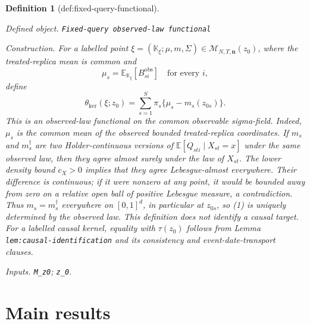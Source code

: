 \documentclass{article}
\newtheorem{definition}{Definition}
\begin{document}
\begin{definition}[def:fixed-query-functional]\label{def:fixed-query-functional}
\par\smallskip\noindent\emph{Defined object.} \texttt{Fixed-\allowbreak{}query observed-\allowbreak{}law functional}
\par\smallskip\noindent\emph{Construction.} For a labelled point
\(\xi=(\mathbb K_\xi;\mu,m,\Sigma)\in
\mathcal M_{N,T,\mathbf n}(z_0)\), where the treated-replica mean is common and
\[
 \mu_s=\mathbb E_{\mathbb K_\xi}[B_{si}^{\mathrm{obs}}]
 \quad\text{for every }i,
\]
define
\[
 \theta_{\mathrm{ker}}(\xi;z_0)
 =\sum_{s=1}^{S}\pi_s\{\mu_s-m_s(z_{0s})\}.                   \tag{1}
\]
This is an observed-law functional on the common observable sigma-field.  Indeed, \(\mu_s\) is the common mean of the observed bounded treated-replica coordinates.  If \(m_s\) and \(m_s^\dagger\) are two Holder-continuous versions of
\(\mathbb E[Q_{sti}\mid X_{st}=x]\) under the same observed law, then they agree almost surely under the law of \(X_{st}\).  The lower density bound \(c_X>0\) implies that they agree Lebesgue-almost everywhere.  Their difference is continuous; if it were nonzero at any point, it would be bounded away from zero on a relative open ball of positive Lebesgue measure, a contradiction.  Thus
\(m_s=m_s^\dagger\) everywhere on \([0,1]^d\), in particular at \(z_{0s}\), so (1) is uniquely determined by the observed law.  This definition does not identify a causal target.  For a labelled causal kernel, equality with \(\tau(z_0)\) follows from Lemma \texttt{lem:causal-identification} and its consistency and event-date-transport clauses.
\par\smallskip\noindent\emph{Inputs.} \texttt{M\_\allowbreak{}z0}; \texttt{z\_\allowbreak{}0}.
\end{definition}

\section{Main results}
\end{document}

